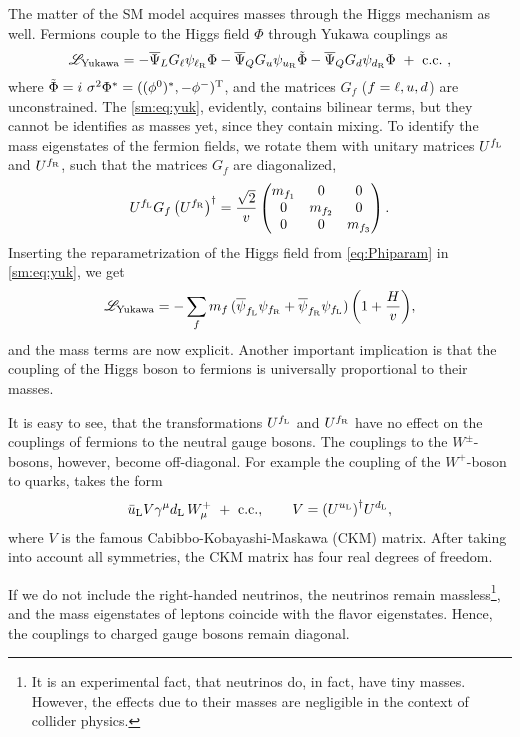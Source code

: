The matter of the SM model acquires masses through the Higgs mechanism as well. 
Fermions couple to the Higgs field $\Phi$ through Yukawa couplings as
\begin{equation} \label{sm:eq:yuk}
{\mathscr{L}}_{\text{Yukawa}} = -\overline\Psi_L G_\ell \psi_{\ell_{\mathrm{R}}}\Phi
-\overline\Psi_Q G_u \psi_{u_{\mathrm{R}}}\tilde\Phi
-\overline\Psi_Q G_d \psi_{d_{\mathrm{R}}}\Phi
~+~\text{c.c.}~,
\end{equation}
where $\tilde\Phi= i~\sigma^2\Phi^*=((\phi^0)^*,-\phi^-)^{\mathrm{T}}$,
and the matrices $G_f$ ($f=\ell,u,d$) are unconstrained.
The \cref{sm:eq:yuk}, evidently, contains bilinear terms, but they cannot be identifies as masses yet,
since they contain mixing.
To identify the mass eigenstates of the fermion fields, we 
rotate them with unitary matrices $U^{f_{{\mathrm{L}}}}$ and $U^{f_{{\mathrm{R}}}}$,
such that the matrices $G_f$ are diagonalized,
\begin{align}\label{eq:diagyuk}
  U^{f_{\rL}}G_{f}\left(U^{{f}_{\rR}}\right)^\dagger = \frac{\sqrt{2}}{v} \pmqty{m_{f_1} &0&0\\0&m_{f_2}&0\\0&0&m_{f_3} }. 
\end{align}
Inserting the reparametrization of the Higgs field from \cref{eq:Phiparam} in \cref{sm:eq:yuk}, we get
\begin{equation}
{\mathscr{L}}_{{\text{Yukawa}}} = -\sum_f m_f \,
(\overline\psi_{f_{\mathrm{L}}}\psi_{f_{\mathrm{R}}}+\overline\psi_{f_{\mathrm{R}}}\psi_{f_{\mathrm{L}}})
\, \biggl(1+\frac{H}{v}\biggr),
\end{equation}
and the mass terms are now explicit.
Another important implication is that the coupling of the Higgs boson
to fermions is universally proportional to their masses.

It is easy to see, that the transformations $U^{f_{{\mathrm{L}}}}$ and $U^{f_{{\mathrm{R}}}}$ have no effect on the couplings of fermions to the 
neutral gauge bosons. The couplings to the $W^{\pm}$-bosons, however, become off-diagonal.
For example the coupling of the $W^+$-boson to quarks, takes the form
\begin{equation}
  \bar{u}_{\mathrm{L}} V \gamma^\mu d_{\mathrm{L}} \, W_\mu^+ ~+~ \text{c.c.}, \qquad V = \qty(U^{u_{{\mathrm{L}}}})^\dagger U^{d_{{\mathrm{L}}}},
\end{equation}
where $V$ is the famous Cabibbo-Kobayashi-Maskawa (CKM) matrix.
After taking into account all symmetries, the CKM matrix has four real degrees of freedom.

If we do not include the right-handed neutrinos, the neutrinos remain massless\footnote{
  It is an experimental fact, that neutrinos do, in fact, have tiny masses.
  However, the effects due to their masses are negligible in the context of collider physics.
},
and the mass eigenstates of leptons coincide with the flavor eigenstates. Hence,
the couplings to charged gauge bosons remain diagonal.


